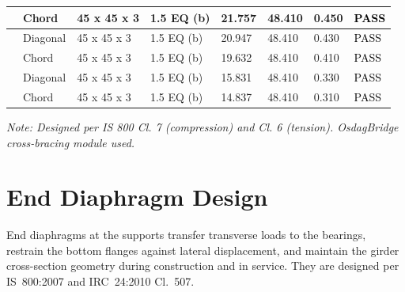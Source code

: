 \documentclass[12pt,a4paper]{report}
\numberwithin{table}{chapter}
\numberwithin{figure}{chapter}
\begin{document}
\begin{longtable}{|C{2.0cm}|L{1.8cm}|C{2.2cm}|C{3.0cm}|C{1.8cm}|C{1.8cm}|C{1.2cm}|C{1.8cm}|}
 & Chord & 45 x 45 x 3 & 1.5 EQ (b) & 21.757 & 48.410 & 0.450 & \textcolor{black}{PASS} \\[6pt]
\hline
{} & Diagonal & 45 x 45 x 3 & 1.5 EQ (b) & 20.947 & 48.410 & 0.430 & \textcolor{black}{PASS} \\[6pt]
 & Chord & 45 x 45 x 3 & 1.5 EQ (b) & 19.632 & 48.410 & 0.410 & \textcolor{black}{PASS} \\[6pt]
\hline
{} & Diagonal & 45 x 45 x 3 & 1.5 EQ (b) & 15.831 & 48.410 & 0.330 & \textcolor{black}{PASS} \\[6pt]
 & Chord & 45 x 45 x 3 & 1.5 EQ (b) & 14.837 & 48.410 & 0.310 & \textcolor{black}{PASS} \\[6pt]
\hline
\end{longtable}
\noindent\textit{Note: Designed per IS 800 Cl. 7 (compression) and Cl. 6 (tension). OsdagBridge cross-bracing module used.}

\section{End Diaphragm Design}
\label{sec:end-diaphragm}

End diaphragms at the supports transfer transverse loads to the bearings, restrain the bottom flanges against lateral displacement, and maintain the girder cross-section geometry during construction and in service. They are designed per IS~800:2007 and IRC~24:2010 Cl.~507.

\vspace{1em}

\vspace{0.4em}
\noindent
\setlength{\tabcolsep}{4pt}
\setlength{\LTleft}{0pt}
\setlength{\LTright}{\fill}
\end{document}
